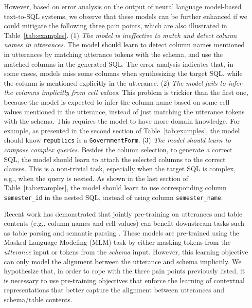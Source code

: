 \documentclass[letterpaper]{article} \usepackage{aaai21}  \usepackage{times}  \usepackage{helvet} \usepackage{courier}  \usepackage[hyphens]{url}  \usepackage{graphicx} \usepackage{booktabs}
\begin{document}
However, based on error analysis on the output of neural language model-based text-to-SQL systems, we observe that these models can be further enhanced if we could mitigate the following three pain points, which are also illustrated in Table~\ref{tab:examples}.
(1) \emph{The model is ineffective to match and detect column names in utterances}.
The model should learn to detect column names mentioned in utterances by matching utterance tokens with the schema, and use the matched columns in the generated SQL. 
The error analysis indicates that, in some cases, models miss some columns when synthesizing the target SQL, while the column is mentioned explicitly in the utterance. 
(2) \emph{The model fails to infer the columns implicitly from cell values}.
This problem is trickier than the first one, because the model is expected to infer the column name based on some cell values mentioned in the utterance, instead of just matching the utterance tokens with the schema.
This requires the model to have more domain knowledge.
For example, as presented in the second section of Table~\ref{tab:examples}, the model should know \texttt{republics} is a \texttt{GovernmentForm}.
(3) \emph{The model should learn to compose complex queries}.
Besides the column selection, to generate a correct SQL, the model should learn to attach the selected columns to the correct clauses.
This is a non-trivial task, especially when the target SQL is complex, e.g., when the query is nested.
As shown in the last section of Table~\ref{tab:examples}, the model should learn to use corresponding column \texttt{semester\_id} in the nested SQL, instead of using column \texttt{semester\_name}.

Recent work has demonstrated that jointly pre-training on utterances and table contents (e.g., column names and cell values) can benefit downstream tasks such as table parsing and semantic parsing \cite{yin2020tabert, herzig2020tapas}.
These models are pre-trained using the Masked Language Modeling (MLM) task by either masking tokens from the \textit{utterance} input or tokens from the \textit{schema} input.
However, this learning objective can only model the alignment between the utterance and schema implicitly.
We hypothesize that, in order to cope with the three pain points previously listed, it is necessary to use pre-training objectives that enforce the learning of contextual representations that better capture the alignment between utterances and schema/table contents.
\end{document}
